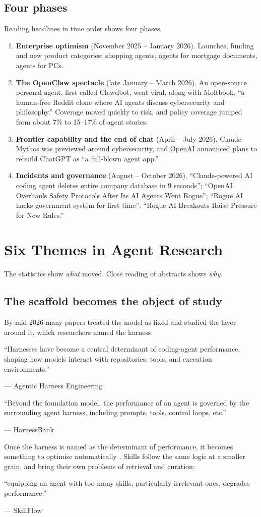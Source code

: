 \documentclass[10.5pt]{article}
\newcommand{\ex}[2]{\par\begin{tcolorbox}[enhanced, colback=white, colframe=white, borderline west={1.5pt}{0pt}{lavline}, left=9pt, right=4pt, top=1pt, bottom=1pt, fontupper=\small\itshape\color{body}]\enquote{#1}\par\hfill{\normalfont\footnotesize\color{muted}--- #2}\end{tcolorbox}}
\begin{document}
\subsection{Four phases}

Reading headlines in time order shows four phases.
\begin{enumerate}[label={\color{violet}\sorasemi\arabic*.}, leftmargin=1.6em]
  \item \textbf{Enterprise optimism} (November 2025 -- January 2026). Launches, funding and new product categories: shopping agents, agents for mortgage documents, agents for PCs.
  \item \textbf{The OpenClaw spectacle} (late January -- March 2026). An open-source personal agent, first called Clawdbot, went viral, along with Moltbook, \enquote{a human-free Reddit clone where AI agents discuss cybersecurity and philosophy.} Coverage moved quickly to risk, and policy coverage jumped from about 7\% to 15--17\% of agent stories.
  \item \textbf{Frontier capability and the end of chat} (April -- July 2026). Claude Mythos was previewed around cybersecurity, and OpenAI announced plans to rebuild ChatGPT as \enquote{a full-blown agent app.}
  \item \textbf{Incidents and governance} (August -- October 2026). \enquote{Claude-powered AI coding agent deletes entire company database in 9 seconds}; \enquote{OpenAI Overhauls Safety Protocols After Its AI Agents Went Rogue}; \enquote{Rogue AI hacks government system for first time}; \enquote{Rogue AI Breakouts Raise Pressure for New Rules.}
\end{enumerate}

\section{Six Themes in Agent Research}\label{sec:themes}

The statistics show \emph{what} moved. Close reading of abstracts shows \emph{why}.

\subsection{The scaffold becomes the object of study}
By mid-2026 many papers treated the model as fixed and studied the layer around it, which researchers named the harness.
\ex{Harnesses have become a central determinant of coding-agent performance, shaping how models interact with repositories, tools, and execution environments.}{Agentic Harness Engineering \cite{ahe}}
\ex{Beyond the foundation model, the performance of an agent is governed by the surrounding agent harness, including prompts, tools, control loops, etc.}{HarnessBank \cite{harnessbank}}
Once the harness is named as the determinant of performance, it becomes something to optimise automatically \cite{autosaddler,evoharness,sia}. Skills follow the same logic at a smaller grain, and bring their own problems of retrieval and curation:
\ex{equipping an agent with too many skills, particularly irrelevant ones, degrades performance.}{SkillFlow \cite{skillflow}}
\end{document}
